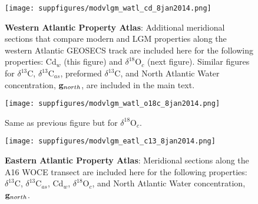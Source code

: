 \documentclass[agums]{aguplus}  %
\begin{document}


\begin{figure}
     \texttt{[image: suppfigures/modvlgm\_watl\_cd\_8jan2014.png]}
     \caption{{\bf Western Atlantic Property Atlas}: Additional meridional sections that compare modern and LGM properties along the western Atlantic GEOSECS track are included here for the following properties: Cd$_w$ (this figure) and $\delta^{18}$O$_c$ (next figure). Similar figures for $\delta^{13}$C, $\delta^{13}$C$_{as}$, preformed $\delta^{13}$C, and North Atlantic Water concentration, ${\bf g}_{north}$, are included in the main text.}
\end{figure}

\begin{figure}
     \texttt{[image: suppfigures/modvlgm\_watl\_o18c\_8jan2014.png]}
     \caption{Same as previous figure but for $\delta^{18}$O$_c$.}
\end{figure}



\begin{figure}
     \texttt{[image: suppfigures/modvlgm\_eatl\_c13\_8jan2014.png]}
     \caption{{\bf Eastern Atlantic Property Atlas}: Meridional sections along the A16 WOCE transect are included here for the following properties:  $\delta^{13}$C, $\delta^{13}$C$_{as}$, Cd$_w$, $\delta^{18}$O$_c$, and North Atlantic Water concentration, ${\bf g}_{north}$.}
\end{figure}
\end{document}
